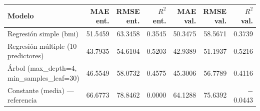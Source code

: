 \begin{tabular}{lrrrrrr}
\toprule
Modelo & MAE ent. & RMSE ent. & $R^2$ ent. & MAE val. & RMSE val. & $R^2$ val. \\
\midrule
Regresión simple (bmi) & 51.5459 & 63.3458 & 0.3545 & 50.3475 & 58.5671 & 0.3739 \\
Regresión múltiple (10 predictores) & 43.7935 & 54.6104 & 0.5203 & 42.9389 & 51.1937 & 0.5216 \\
Árbol (max\_depth=4, min\_samples\_leaf=30) & 46.5549 & 58.0732 & 0.4575 & 45.3006 & 56.7789 & 0.4116 \\
Constante (media) — referencia & 66.6773 & 78.8462 & 0.0000 & 64.1288 & 75.6392 & $-$0.0443 \\
\bottomrule
\end{tabular}
